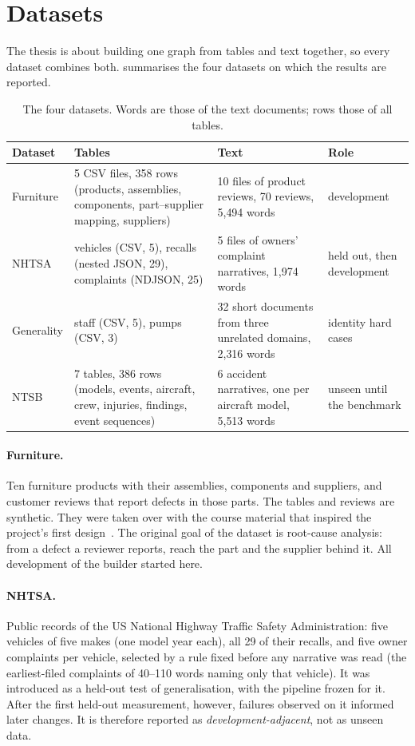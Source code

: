 \section{Datasets}\label{sec:ch03-datasets}

The thesis is about building one graph from tables and text together, so every dataset combines both.
 summarises the four datasets on which the results are reported.

\begin{table}[htbp]
\centering
\caption{The four datasets. Words are those of the text documents; rows those of all tables.}
\label{tab:datasets}
\small
\begin{tabularx}{\linewidth}{@{}lXXl@{}}
\toprule
Dataset & Tables & Text & Role \\
\midrule
Furniture & 5 CSV files, 358 rows (products, assemblies, components, part--supplier mapping, suppliers) & 10 files of product reviews, 70 reviews, 5{,}494 words & development \\
NHTSA & vehicles (CSV, 5), recalls (nested JSON, 29), complaints (NDJSON, 25) & 5 files of owners' complaint narratives, 1{,}974 words & held out, then development \\
Generality & staff (CSV, 5), pumps (CSV, 3) & 32 short documents from three unrelated domains, 2{,}316 words & identity hard cases \\
NTSB & 7 tables, 386 rows (models, events, aircraft, crew, injuries, findings, event sequences) & 6 accident narratives, one per aircraft model, 5{,}513 words & unseen until the benchmark \\
\bottomrule
\end{tabularx}
\end{table}

\paragraph{Furniture.} Ten furniture products with their assemblies, components and suppliers, and customer
reviews that report defects in those parts. The tables and reviews are synthetic. They were taken over with the
course material that inspired the project's first design~\cite{kollegger2025agentic}.
The original goal of the dataset is root-cause analysis: from a defect a reviewer reports, reach the part and the supplier behind
it. All development of the builder started here.

\paragraph{NHTSA.} Public records of the US National Highway Traffic Safety Administration: five vehicles of
five makes (one model year each), all 29 of their recalls, and five owner complaints per vehicle, selected by
a rule fixed before any narrative was read (the earliest-filed complaints of 40--110 words naming only that
vehicle). It was introduced as a held-out test of generalisation, with the pipeline frozen for it. After the
first held-out measurement, however, failures observed on it informed later changes. It is therefore
reported as \emph{development-adjacent}, not as unseen data.

